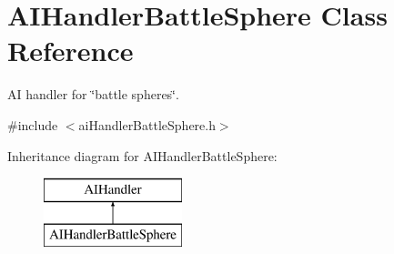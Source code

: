 \hypertarget{classAIHandlerBattleSphere}{
\section{\-A\-I\-Handler\-Battle\-Sphere \-Class \-Reference}
\label{dc/dfb/classAIHandlerBattleSphere}
}


\-A\-I handler for \char`\"{}battle spheres\char`\"{}.  




{\ttfamily \#include $<$ai\-Handler\-Battle\-Sphere.\-h$>$}

\-Inheritance diagram for \-A\-I\-Handler\-Battle\-Sphere\-:\begin{figure}[H]
\begin{center}
\leavevmode
\includegraphics[height=2.000000cm]{dc/dfb/classAIHandlerBattleSphere}
\end{center}
\end{figure}
